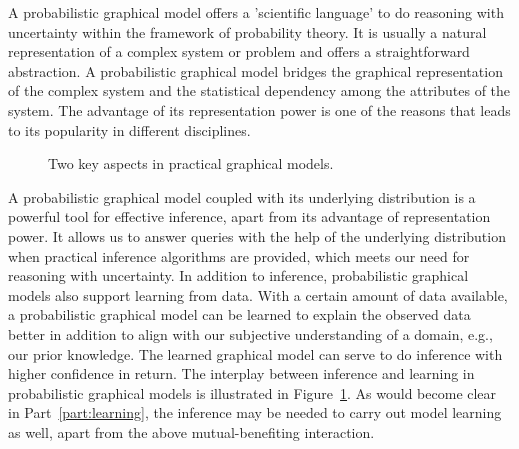 A probabilistic graphical model offers a 'scientific language' to do reasoning with uncertainty within the framework of probability theory. It is usually a natural representation of a complex system or problem and offers a straightforward abstraction. A probabilistic graphical model bridges the graphical representation of the complex system and the statistical dependency among the attributes of the system.
The advantage of its representation power is one of the reasons that leads to its popularity in different disciplines.

\begin{figure}[!t]
  \centering
  \caption{Two key aspects in practical graphical models.}
  \label{fig:intro-pgm}
\end{figure}

A probabilistic graphical model coupled with its underlying distribution is a powerful tool for effective inference, apart from its advantage of representation power. It allows us to answer queries with the help of the underlying distribution when practical inference algorithms are provided, which meets our need for reasoning with uncertainty. In addition to inference, probabilistic graphical models also support learning from data. With a certain amount of data available, a probabilistic graphical model can be learned to explain the observed data better in addition to align with our subjective understanding of a domain, e.g., our prior knowledge. The learned graphical model can serve to do inference with higher confidence in return. The interplay between inference and learning in probabilistic graphical models is illustrated in Figure~\ref{fig:intro-pgm}. As would become clear in Part~\ref{part:learning}, the inference may be needed to carry out model learning as well, apart from the above mutual-benefiting interaction.



